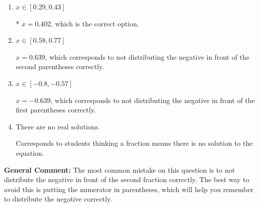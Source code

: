 \documentclass{extbook}[14pt]
\begin{document}
\begin{enumerate}
{\begin{enumerate}[label=\Alph*.]
$x = -0.819$, which corresponds to getting the negative of the actual solution.
\item \( x \in [0.29, 0.43] \)

* $x = 0.402$, which is the correct option.
\item \( x \in [0.58, 0.77] \)

$x = 0.639$, which corresponds to not distributing the negative in front of the second parentheses correctly.
\item \( x \in [-0.8, -0.57] \)

$x = -0.639$, which corresponds to not distributing the negative in front of the first parentheses correctly.
\item \( \text{There are no real solutions.} \)

Corresponds to students thinking a fraction means there is no solution to the equation.
\end{enumerate}

\textbf{General Comment:} The most common mistake on this question is to not distribute the negative in front of the second fraction correctly. The best way to avoid this is putting the numerator in parentheses, which will help you remember to distribute the negative correctly.
}
\end{enumerate}
\end{document}
